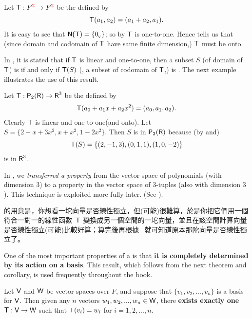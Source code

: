 \begin{example} \label{example 2.1.12}
Let \(\T : F^{\RED{2}} \to F^{\RED{2}}\) be the \LTRAN{} defined by
\[
    \textsf{T}(a_1, a_2) = (a_1 + a_2, a_1).
\]
It is easy to see that \(\textsf{N(T)} = \{ 0_{_{\textsf{V}}} \}\);
so by  \(\textsf{T}\) is one-to-one.
Hence  tells us that (since domain and codomain of \(\textsf{T}\) have same finite dimension,) \(\textsf{T}\) must be onto.
\end{example}

\begin{note}
In , it is stated that if \(\textsf{T}\) is linear and one-to-one, then a subset \(S\) (of domain of \(\textsf{T}\)) is \LID{} if and only if \(\textsf{T}(S)\) (, a subset of codomain of \(\textsf{T}\),) is \LID{}.
The next example illustrates the use of this result.
\end{note}

\begin{example} \label{example 2.1.13}
Let \(\textsf{T} : \textsf{P}_2(\textsf{R}) \to \textsf{R}^3\) be the \LTRAN{} defined by
\[
    \textsf{T}(a_0 + a_1 x + a_2 x^2) = (a_0, a_1, a_2).
\]
Clearly \(\textsf{T}\) is linear and one-to-one(and onto).
Let \(S = \{ 2 - x + 3x^2, x + x^2, 1 - 2x^2 \}\).
Then \(S\) is \LID{} in \(\textsf{P}_2(\textsf{R})\) because (by  and)
\[
    \textsf{T}(S) = \{ (2, -1, 3), (0, 1, 1), (1, 0, -2) \}
\]
is \LID{} in \(\textsf{R}^3\).
\end{example}

\begin{remark} \label{remark 2.1.11}
In , we \emph{transferred a property} from the vector space of polynomials (with dimension \(3\)) to a property in the vector space of \(3\)-tuples (also with dimension \(3\)).
This technique is exploited more fully later.
(See ).
\end{remark}

\begin{note}
 的用意是，你想看一坨向量是否線性獨立，但(可能)很難算，於是你把它們用一個符合一對一的線性函數\ \(\textsf{T}\) 變換成另一個空間的一坨向量，並且在該空間計算向量是否線性獨立(可能)比較好算；算完後再根據\  就可知道原本那陀向量是否線性獨立了。
\end{note}

One of the most important properties of a \LTRAN{} is that \textbf{it is completely determined by its action on a basis}.
This result, which follows from the next theorem and corollary, is used frequently throughout the book.

\begin{theorem} \label{thm 2.6}
Let \(\textsf{V}\) and \(\textsf{W}\) be vector spaces over \(F\), and suppose that \(\{ v_1, v_2, ..., v_n \}\) is a basis for \(\textsf{V}\).
Then given any \(n\) vectors \(w_1, w_2, ..., w_n \in \textsf{W}\), there \textbf{exists exactly one} \LTRAN{} \(\textsf{T} : \textsf{V} \to \textsf{W}\) such that \(\textsf{T}(v_i) = w_i\) for \(i= 1, 2, ..., n\).
\end{theorem}

